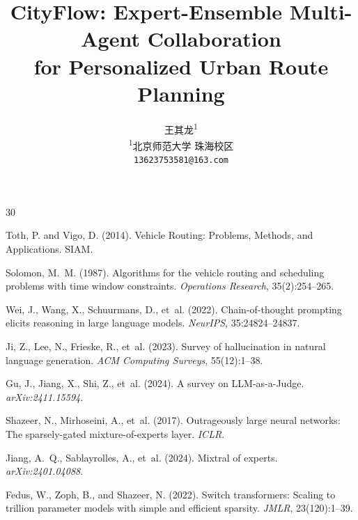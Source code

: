 \documentclass[11pt]{article}
\title{\textbf{CityFlow}: Expert-Ensemble Multi-Agent Collaboration\\for Personalized Urban Route Planning}
\author{%
  王其龙\textsuperscript{1}\\[2pt]
  \textsuperscript{1}北京师范大学 珠海校区\\[2pt]
  \texttt{13623753581@163.com}%
}
\begin{document}
\maketitle















\begin{thebibliography}{30}

Toth, P. and Vigo, D. (2014).
\newblock Vehicle Routing: Problems, Methods, and Applications.
\newblock SIAM.

Solomon, M.~M. (1987).
\newblock Algorithms for the vehicle routing and scheduling problems with time window constraints.
\newblock \emph{Operations Research}, 35(2):254--265.

Wei, J., Wang, X., Schuurmans, D., et~al. (2022).
\newblock Chain-of-thought prompting elicits reasoning in large language models.
\newblock \emph{NeurIPS}, 35:24824--24837.

Ji, Z., Lee, N., Frieske, R., et~al. (2023).
\newblock Survey of hallucination in natural language generation.
\newblock \emph{ACM Computing Surveys}, 55(12):1--38.

Gu, J., Jiang, X., Shi, Z., et~al. (2024).
\newblock A survey on LLM-as-a-Judge.
\newblock \emph{arXiv:2411.15594}.

Shazeer, N., Mirhoseini, A., et~al. (2017).
\newblock Outrageously large neural networks: The sparsely-gated mixture-of-experts layer.
\newblock \emph{ICLR}.

Jiang, A.~Q., Sablayrolles, A., et~al. (2024).
\newblock Mixtral of experts.
\newblock \emph{arXiv:2401.04088}.

Fedus, W., Zoph, B., and Shazeer, N. (2022).
\newblock Switch transformers: Scaling to trillion parameter models with simple and efficient sparsity.
\newblock \emph{JMLR}, 23(120):1--39.


\end{thebibliography}
\end{document}
